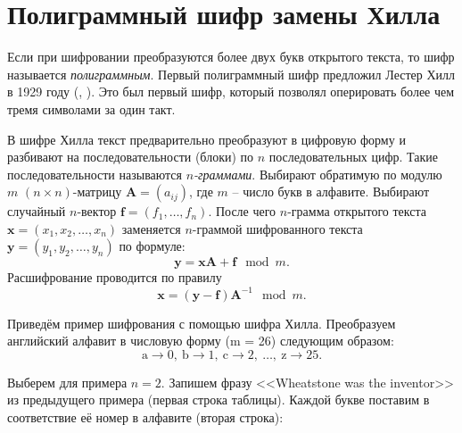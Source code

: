 \section{Полиграммный шифр замены Хилла}

Если при шифровании преобразуются более двух букв открытого текста, то шифр называется \emph{полиграммным}. Первый полиграммный шифр предложил Лестер Хилл в 1929 году (, \cite{Hill:1929, Hill:1931}). Это был первый шифр, который позволял оперировать более чем тремя символами за один такт.

В шифре Хилла текст предварительно преобразуют в цифровую форму и разбивают на последовательности (блоки) по $n$ последовательных цифр. Такие последовательности называются \emph{$n$-граммами}. Выбирают обратимую по модулю $m$  $(n \times n)$-матрицу $\mathbf{A} = (a_{ij})$, где $m$ -- число букв в алфавите. Выбирают случайный $n$-вектор $\mathbf{f} = (f_1, \dots, f_n)$. После чего $n$-грамма открытого текста $\mathbf{x} = (x_1, x_2, \dots, x_n)$ заменяется $n$-граммой шифрованного текста $\mathbf{y} = (y_1, y_2, \dots, y_n)$ по формуле:
    \[ \mathbf{y} = \mathbf{x} \mathbf{A} + \mathbf{f} \mod m. \]
Расшифрование проводится по правилу
    \[ \mathbf{x} = (\mathbf{y} - \mathbf{f}) \mathbf{A}^{-1} \mod m. \]

\example
Приведём пример шифрования с помощью шифра Хилла. Преобразуем английский алфавит в числовую форму (m = 26) следующим образом:
\[ \text{a} \rightarrow 0, ~ \text{b} \rightarrow 1, ~ \text{c} \rightarrow 2, ~ \dots, ~ \text{z} \rightarrow 25. \]

Выберем для примера $n = 2$. Запишем фразу <<Wheatstone was the inventor>> из предыдущего примера (первая строка таблицы). Каждой букве поставим в соответствие её номер в алфавите (вторая строка):
\begin{center}  \end{center}

